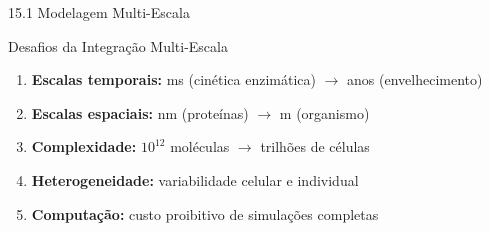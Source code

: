 \begin{frame}{15.1 Modelagem Multi-Escala}

\vspace{0.3cm}

\begin{block}{Desafios da Integração Multi-Escala}
\begin{enumerate}
    \item \textbf{Escalas temporais:} ms (cinética enzimática) $\rightarrow$ anos (envelhecimento)
    \item \textbf{Escalas espaciais:} nm (proteínas) $\rightarrow$ m (organismo)
    \item \textbf{Complexidade:} $10^{12}$ moléculas $\rightarrow$ trilhões de células
    \item \textbf{Heterogeneidade:} variabilidade celular e individual
    \item \textbf{Computação:} custo proibitivo de simulações completas
\end{enumerate}
\end{block}

\end{frame}

